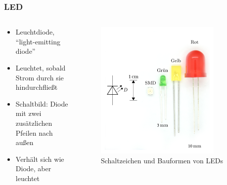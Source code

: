 \begin{frame}
\frametitle{LED}
\begin{columns}
    \begin{column}{0.48\textwidth}
    \begin{itemize}
  \item Leuchtdiode, \enquote{light-emitting diode}
  \item Leuchtet, sobald Strom durch sie hindurchfließt
  \item Schaltbild: Diode mit zwei zusätzlichen Pfeilen nach außen
  \item Verhält sich wie Diode, aber leuchtet
  \end{itemize}

    \end{column}
   \begin{column}{0.48\textwidth}
       
\begin{figure}
    \includegraphics[width=0.85\textwidth]{foto/205}
    \caption{\scriptsize Schaltzeichen und Bauformen von LEDs}
    \label{n_halbleiter_led}
\end{figure}

   \end{column}
\end{columns}

\end{frame}

